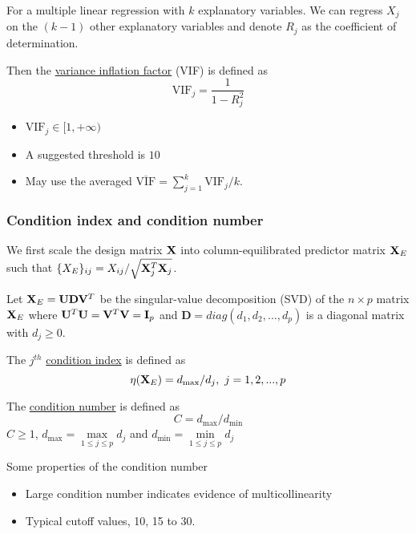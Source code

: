 For a multiple linear regression with $k$ explanatory variables.
We can regress $X_j$ on the $(k-1)$ other explanatory variables and denote $R_j$ as the coefficient of determination.

Then the \underline{variance inflation factor} (VIF) is defined as
\begin{equation*}
	\mbox{VIF}_j = \frac{1}{1 - R_j^2}
\end{equation*}

\begin{itemize}
	\item $\mbox{VIF}_j \in [1, +\infty)$
	\item A suggested threshold is $10$
	\item May use the averaged $\overline{\mbox{VIF}}=\sum\limits_{j=1}^k{\mbox{VIF}_j}\bigg/ k$.
\end{itemize}

\subsubsection*{Condition index and condition number}
We first scale the design matrix $\mathbf{X}$ into column-equilibrated predictor matrix $\mathbf{X}_E$
such that $\{X_E\}_{ij} = X_{ij} / \sqrt{\mathbf{X}_j^T \mathbf{X}_j}$.

Let $\mathbf{X}_E=\mathbf{U}\mathbf{D}\mathbf{V}^T$ be the singular-value decomposition (SVD) of
the $n \times p$ matrix $\mathbf{X}_E$
where $\mathbf{U}^T \mathbf{U} = \mathbf{V}^T \mathbf{V} = \mathbf{I}_p$
and $\mathbf{D} = diag(d_1, d_2, ..., d_p)$ is a diagonal matrix with $d_j \ge 0$.

\vspace{1.5em}
The $j^{th}$ \underline{condition index} is defined as 
\begin{equation*}
	\eta(\mathbf{X}_E) = d_{\max} / d_j, \mbox{      } j=1, 2, ..., p
\end{equation*}

\vspace{0.5em}
The \underline{condition number} is defined as
\begin{equation*}
	C = d_{\max} / d_{\min}
\end{equation*}
$C \ge 1$, $d_{\max}=\max\limits_{1 \le j \le p}d_j$ and $d_{\min}=\min\limits_{1 \le j \le p}d_j$

Some properties of the condition number
\begin{itemize}
	\item Large condition number indicates evidence of multicollinearity
	\item Typical cutoff values, 10, 15 to 30.
\end{itemize}

